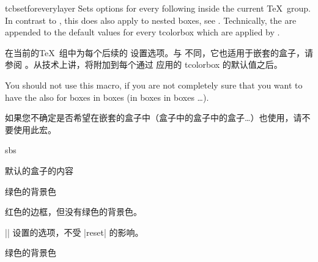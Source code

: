 \begin{docCommand}{tcbsetforeverylayer}{}
Sets options for every following  inside the current \TeX\ group.
In contrast to , this does also
apply to nested boxes, see .
Technically, the  are appended to the default values for every
tcolorbox which are applied by .


在当前的\TeX\ 组中为每个后续的 设置选项。与 不同，它也适用于嵌套的盒子，请参阅 。从技术上讲，将附加到每个通过  应用的 tcolorbox 的默认值之后。%

You should not use this macro, if you are not completely sure that you
want to have the  also for boxes in boxes (in boxes in boxes \ldots).


如果您不确定是否希望在嵌套的盒子中（盒子中的盒子中的盒子\ldots）也使用，请不要使用此宏。
\begin{dispExample*}{sbs}
\begin{tcolorbox}[title=默认的盒子]
默认的盒子的内容
\end{tcolorbox}


\begin{tcolorbox}%
[title=All options for this box]
绿色的背景色\par\medskip
\begin{tcolorbox}[title=嵌套的盒子]
红色的边框，但没有绿色的背景色。
\end{tcolorbox}
\end{tcolorbox}
\bigskip

\begin{tcolorbox}[reset,%
title={reset的盒子}]
|\tcbsetforeverylayer|%
设置的选项，不受 |reset| 的影响。
\end{tcolorbox}

\begin{tcolorbox}[title=默认的盒子]
绿色的背景色
\end{tcolorbox}
\end{dispExample*}
\end{docCommand}
